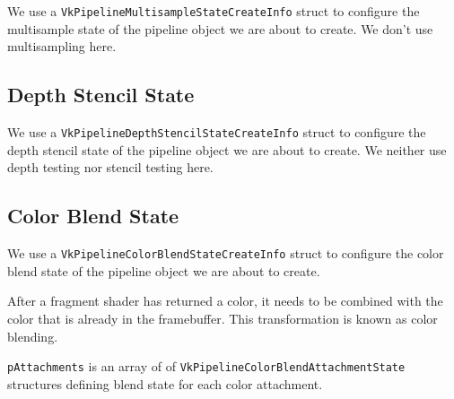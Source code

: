 We use a \texttt{VkPipelineMultisampleStateCreateInfo} struct to configure
the multisample state of the pipeline object we are about to create.
We don't use multisampling here.

\begin{minipage}{\linewidth}{\noindent}
    
\end{minipage}

\subsection{Depth Stencil State}

We use a \texttt{VkPipelineDepthStencilStateCreateInfo} struct to configure
the depth stencil state of the pipeline object we are about to create.
We neither use depth testing nor stencil testing here.

\begin{minipage}{\linewidth}{\noindent}
    
\end{minipage}

\subsection{Color Blend State}

We use a \texttt{VkPipelineColorBlendStateCreateInfo} struct to configure
the color blend state of the pipeline object we are about to create.

After a fragment shader has returned a color,
it needs to be combined with the color that is already in the framebuffer.
This transformation is known as color blending.

\texttt{pAttachments} is an array of of
\texttt{VkPipelineColorBlendAttachmentState} structures defining blend state for
each color attachment.

\begin{minipage}{\linewidth}{\noindent}
    
\end{minipage}

